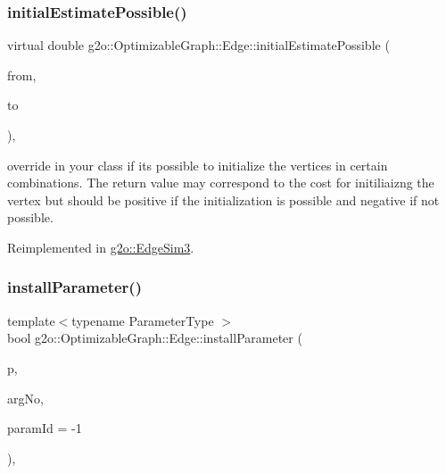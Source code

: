 \subsubsection{\texorpdfstring{initial\+Estimate\+Possible()}{initialEstimatePossible()}}
{\footnotesize\ttfamily virtual double g2o\+::\+Optimizable\+Graph\+::\+Edge\+::initial\+Estimate\+Possible (\begin{DoxyParamCaption}\item[{const \mbox{\hyperlink{classg2o_1_1_hyper_graph_a703938cdb4bb636860eed55a2489d70c}{Optimizable\+Graph\+::\+Vertex\+Set}} \&}]{from,  }\item[{\mbox{\hyperlink{classg2o_1_1_optimizable_graph_1_1_vertex}{Optimizable\+Graph\+::\+Vertex}} $\ast$}]{to }\end{DoxyParamCaption})\hspace{0.3cm}{\ttfamily [inline]}, {\ttfamily [virtual]}}

override in your class if it\textquotesingle{}s possible to initialize the vertices in certain combinations. The return value may correspond to the cost for initiliaizng the vertex but should be positive if the initialization is possible and negative if not possible. 

Reimplemented in \mbox{\hyperlink{classg2o_1_1_edge_sim3_a0fd73623327838b46abdf292582da6ae}{g2o\+::\+Edge\+Sim3}}.

\mbox{\label{classg2o_1_1_optimizable_graph_1_1_edge_a237bea2f2fb7cc6a9cf4ee5ee6fe4d88}} 
\subsubsection{\texorpdfstring{install\+Parameter()}{installParameter()}}
{\footnotesize\ttfamily template$<$typename Parameter\+Type $>$ \\
bool g2o\+::\+Optimizable\+Graph\+::\+Edge\+::install\+Parameter (\begin{DoxyParamCaption}\item[{Parameter\+Type $\ast$\&}]{p,  }\item[{size\+\_\+t}]{arg\+No,  }\item[{int}]{param\+Id = {\ttfamily -\/1} }\end{DoxyParamCaption})\hspace{0.3cm}{\ttfamily [inline]}, {\ttfamily [protected]}}

